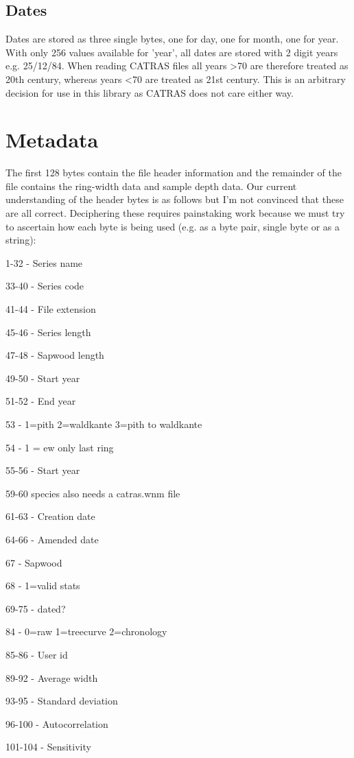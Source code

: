 \subsection{Dates}

Dates are stored as three single bytes, one for day, one for month, one for year. With only 256 values available for 'year', all dates are stored with 2 digit years e.g. 25/12/84. When reading CATRAS files all years >70 are therefore treated as 20th century, whereas years <70 are treated as 21st century. This is an arbitrary decision for use in this library as CATRAS does not care either way. 

\section{Metadata}

The first 128 bytes contain the file header information and the remainder of the file contains the ring-width data and sample depth data. Our current understanding of the header bytes is as follows but I'm not convinced that these are all correct. Deciphering these requires painstaking work because we must try to ascertain how each byte is being used (e.g. as a byte pair, single byte or as a string): 

\begin{itemize*}
 \item 1-32 - Series name
\item  33-40 - Series code
\item  41-44 - File extension
\item  45-46 - Series length
\item  47-48 - Sapwood length
\item  49-50 - Start year
\item  51-52 - End year
\item  53 - 1=pith 2=waldkante 3=pith to waldkante
\item  54 - 1 = ew only last ring
\item  55-56 - Start year
\item  59-60 species also needs a catras.wnm file
\item  61-63 - Creation date
\item  64-66 - Amended date
\item  67 - Sapwood
\item  68 - 1=valid stats
\item  69-75 - dated?
\item  84 - 0=raw 1=treecurve 2=chronology
\item  85-86 - User id
\item  89-92 - Average width
\item  93-95 - Standard deviation
\item  96-100 - Autocorrelation
\item  101-104 - Sensitivity 
\end{itemize*}


